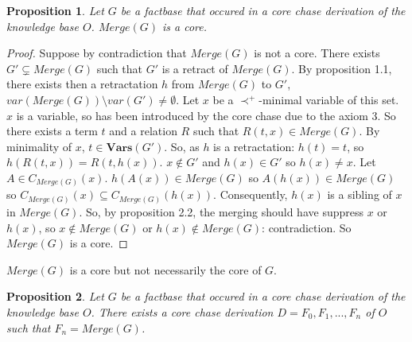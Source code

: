\documentclass{article}
\newtheorem{proposition}{Proposition}[section]
\theoremstyle{definition}
\theoremstyle{remark}
\newcommand{\Vars}{\textbf{Vars}}
\newcommand{\Merge}{\textit{Merge}}
\begin{document}
\begin{proposition} 
Let $G$ be a factbase that occured in a core chase derivation of the knowledge base $O$. $\Merge(G)$ is a core.
\end{proposition}

\begin{proof}
Suppose by contradiction that $\Merge(G)$ is not a core. There exists $G' \subsetneq \Merge(G)$ such that $G'$ is a retract of $\Merge(G)$. By proposition 1.1, there exists then a retractation $h$ from $\Merge(G)$ to $G'$, $var(\Merge(G))\setminus var(G') \neq \emptyset$. Let $x$ be a $\prec^+$-minimal variable of this set. $x$ is a variable, so has been introduced by the core chase due to the axiom 3. So there exists a term $t$ and a relation $R$ such that $R(t,x) \in \Merge(G)$. By minimality of $x$, $t \in \Vars(G')$. So, as $h$ is a retractation: $h(t) = t$, so $h(R(t,x)) = R(t,h(x))$. $x \notin G'$ and $h(x) \in G'$ so $h(x) \neq x$. Let $A \in C_{\Merge(G)}(x)$. $h(A(x)) \in \Merge(G)$ so $A(h(x)) \in \Merge(G)$ so $C_{\Merge(G)}(x) \subseteq C_{\Merge(G)}(h(x))$. Consequently, $h(x)$ is a sibling of $x$ in $\Merge(G)$. So, by proposition 2.2, the merging should have suppress $x$ or $h(x)$, so $x \notin \Merge(G)$ or $h(x) \notin \Merge(G)$: contradiction. So $\Merge(G)$ is a core.
\end{proof}	

$\Merge(G)$ is a core but not necessarily the core of $G$.

\begin{proposition}
Let $G$ be a factbase that occured in a core chase derivation of the knowledge base $O$. There exists a core chase derivation $D = F_0,F_1,...,F_n$ of $O$ such that $F_n = \Merge(G)$.
\end{proposition}
\end{document}
